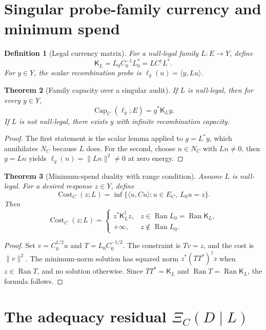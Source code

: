 \documentclass[11pt]{article}
\newtheorem{theorem}{Theorem}[section]
\newtheorem{definition}[theorem]{Definition}
\DeclareMathOperator{\Ran}{Ran}
\DeclareMathOperator{\Cost}{Cost}
\DeclareMathOperator{\Capacity}{Cap}
\newcommand{\K}{\mathsf K}
\begin{document}
\section{Singular probe-family currency and minimum spend}

\begin{definition}[Legal currency matrix]
For a null-legal family \(L:E\to Y\), define
\[
  \K_L=L_0C_0^{-1}L_0^*=LC^\dagger L^*.
\]
For \(y\in Y\), the scalar recombination probe is \(\ell_y(u)=\langle y,Lu\rangle\).
\end{definition}

\begin{theorem}[Family capacity over a singular audit]
If \(L\) is null-legal, then for every \(y\in Y\),
\[
  \Capacity_C(\ell_y;E)=y^*\K_Ly.
\]
If \(L\) is not null-legal, there exists \(y\) with infinite recombination capacity.
\end{theorem}

\begin{proof}
The first statement is the scalar lemma applied to \(g=L^*y\), which annihilates \(N_C\) because \(L\) does.  For the second, choose \(n\in N_C\) with \(Ln\ne0\), then \(y=Ln\) yields \(\ell_y(n)=\|Ln\|^2\ne0\) at zero energy.
\end{proof}

\begin{theorem}[Minimum-spend duality with range condition]
Assume \(L\) is null-legal.  For a desired response \(z\in Y\), define
\[
  \Cost_C(z;L)=\inf\{\langle u,Cu\rangle: u\in E_C,
  \ L_0u=z\}.
\]
Then
\[
  \Cost_C(z;L)=
  \begin{cases}
  z^*\K_L^\dagger z, & z\in\Ran L_0=\Ran\K_L,\\
  +\infty, & z\notin\Ran L_0.
  \end{cases}
\]
\end{theorem}

\begin{proof}
Set \(v=C_0^{1/2}u\) and \(T=L_0C_0^{-1/2}\).  The constraint is \(Tv=z\), and the cost is \(\|v\|^2\).  The minimum-norm solution has squared norm \(z^*(TT^*)^\dagger z\) when \(z\in\Ran T\), and no solution otherwise.  Since \(TT^*=\K_L\) and \(\Ran T=\Ran\K_L\), the formula follows.
\end{proof}

\section{The adequacy residual \texorpdfstring{$\Xi_C(D\mid L)$}{Xi}}
\end{document}
